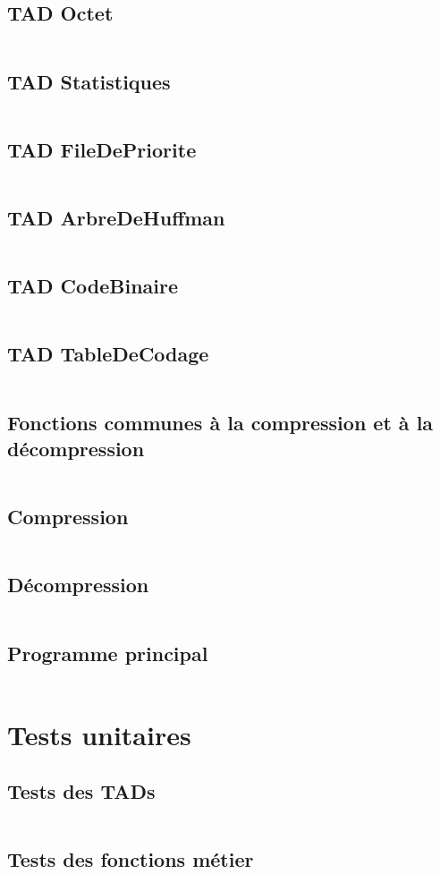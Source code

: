     \subsection{TAD Octet}
        \inputminted[breaklines]{c}{../src/octet.c}
    \subsection{TAD Statistiques}
        \inputminted[breaklines]{c}{../src/statistiques.c}
    \subsection{TAD FileDePriorite}
        \inputminted[breaklines]{c}{../src/fileDePrioriteDArbreDeHuffman.c}
    \subsection{TAD ArbreDeHuffman}
        \inputminted[breaklines]{c}{../src/arbreDeHuffman.c}
    \subsection{TAD CodeBinaire}
        \inputminted[breaklines]{c}{../src/codeBinaire.c}
    \subsection{TAD TableDeCodage}
        \inputminted[breaklines]{c}{../src/tableDeCodage.c}
    \subsection{Fonctions communes à la compression et à la décompression}
        \inputminted[breaklines]{c}{../src/construireArbreDeHuffman.c}
    \subsection{Compression}
        \inputminted[breaklines]{c}{../src/compression.c}
    \subsection{Décompression}
        \inputminted[breaklines]{c}{../src/decompression.c} 
    \subsection{Programme principal}
        \inputminted[breaklines]{c}{../src/main.c}

\newpage
\section{Tests unitaires}
    \subsection{Tests des TADs}
        \inputminted[breaklines]{c}{../src/testsTADs.c}
    \subsection{Tests des fonctions métier}
        \inputminted[breaklines]{c}{../src/testsFonctionsMetier.c}